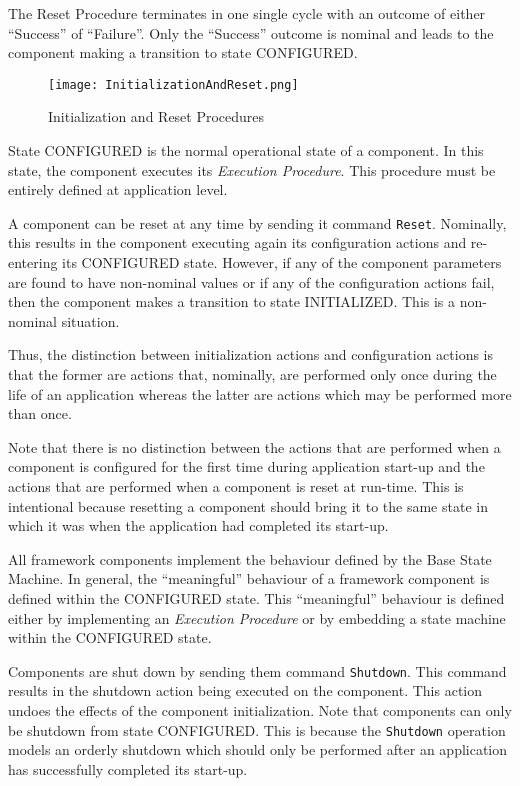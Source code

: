\documentclass{pnp_article}
\begin{document}
The Reset Procedure terminates in one single cycle with an outcome of either “Success” of “Failure”. Only the “Success” outcome is nominal and leads to the component making a transition to state CONFIGURED.

\begin{figure}[ht]
 \centering
 \texttt{[image: InitializationAndReset.png]}
 \caption{Initialization and Reset Procedures}
 \label{fig:InitializationAndReset}
\end{figure}

State CONFIGURED is the normal operational state of a component. In this state, the component executes its \textit{Execution Procedure}. This procedure must be entirely defined at application level. 

A component can be reset at any time by sending it command \texttt{Reset}. Nominally, this results in the component executing again its configuration actions and re-entering its CONFIGURED state. However, if any of the component parameters are found to have non-nominal values or if any of the configuration actions fail, then the component makes a transition to state INITIALIZED. This is a non-nominal situation.

Thus, the distinction between initialization actions and configuration actions is that the former are actions that, nominally, are performed only once during the life of an application whereas the latter are actions which may be performed more than once.

Note that there is no distinction between the actions that are performed when a component is configured for the first time during application start-up and the actions that are performed when a component is reset at run-time. This is intentional because resetting a component should bring it to the same state in which it was when the application had completed its start-up.

All framework components implement the behaviour defined by the Base State Machine. In general, the “meaningful” behaviour of a framework component is defined within the CONFIGURED state. This “meaningful” behaviour is defined either by implementing an \textit{Execution Procedure} or by embedding a state machine within the CONFIGURED state.

Components are shut down by sending them command \texttt{Shutdown}. This command results in the shutdown action being executed on the component. This action undoes the effects of the component initialization. Note that components can only be shutdown from state CONFIGURED. This is because the \texttt{Shutdown} operation models an orderly shutdown which should only be performed after an application has successfully completed its start-up. 
\end{document}
